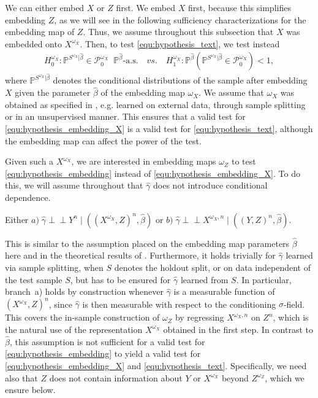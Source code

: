 \documentclass[twoside,11pt]{article}
\newcommand{\indep}{\perp \!\!\! \perp}
\begin{document}
We can either embed $X$ or $Z$ first. We embed $X$ first, because this simplifies embedding $Z$, as we will see in the following sufficiency characterizations for the embedding map of $Z$. Thus, we assume throughout this subsection that $X$ was embedded onto $X^{\omega_X}$. Then, to test \eqref{equ:hypothesis_text}, we test instead
\begin{align}\label{equ:hypothesis_embedding_X}
    H_0^{\omega_X}:\mathbb{P}^{S^{\omega_X}| \hat{\beta}}\in \mathcal{P}_0^{\omega_X}\;\; \mathbb{P}^{ \hat{\beta}}\text{-a.s.}
    \quad vs.\quad 
    H_1^{\omega_X}:\mathbb{P}^{\hat{\beta}}(\mathbb{P}^{S^{\omega_X}| \hat{\beta}}\in \mathcal{P}_0^{\omega_X})<1, 
\end{align}
where $\mathbb{P}^{S^{\omega_X}|\hat{\beta}}$ denotes the conditional distributions of the sample after embedding $X$ given the parameter $\hat{\beta}$ of the embedding map $\omega_X$. 
We assume that $\omega_X$ was obtained as specified in \citet[][Theorem~1, Corollary~3]{simnacher2026deep}, e.g. learned on external data, through sample splitting or in an unsupervised manner. 
This ensures that a valid test for \eqref{equ:hypothesis_embedding_X} is a valid test for \eqref{equ:hypothesis_text}, although the embedding map can affect the power of the test.


Given such a $X^{\omega_X}$, we are interested in embedding maps $\omega_Z$ to test \eqref{equ:hypothesis_embedding} instead of \eqref{equ:hypothesis_embedding_X}. To do this, we will assume throughout that $\hat{\gamma}$ does not introduce conditional dependence. %
\begin{assumption}\label{ass:gamma_no_cond_dep}
    Either $a)\; \hat{\gamma}\indep Y^n\mid ((X^{\omega_X},Z)^n, \hat{\beta})$ or $b)\;\hat{\gamma}\indep X^{\omega_X,n}\mid ((Y,Z)^n, \hat{\beta})$.
\end{assumption}
This is similar to the assumption placed on the embedding map parameters $\hat{\beta}$ here and in the theoretical results of \citet{simnacher2026deep}. 
Furthermore, it holds trivially for $\hat{\gamma}$ learned via sample splitting, when $S$ denotes the holdout split, or on data independent of the test sample $S$, but has to be ensured for $\hat{\gamma}$ learned from $S$.
In particular, branch~a) holds by construction whenever $\hat\gamma$ is a measurable function of $(X^{\omega_X},Z)^n$, since $\hat\gamma$ is then measurable with respect to the conditioning $\sigma$-field. This covers the in-sample construction of $\omega_Z$ by regressing $X^{\omega_X,n}$ on $Z^n$, which is the natural use of the representation $X^{\omega_X}$ obtained in the first step.
In contrast to $\hat{\beta}$, this assumption is not sufficient for a valid test for \eqref{equ:hypothesis_embedding} to yield a valid test for \eqref{equ:hypothesis_embedding_X} and \eqref{equ:hypothesis_text}. Specifically, we need also that $Z$ does not contain information about $Y$ or $X^{\omega_X}$ beyond $Z^{\omega_Z}$, which we ensure below.
\end{document}
